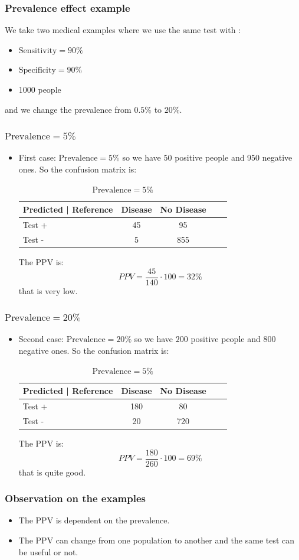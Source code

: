 \documentclass[9pt]{beamer}
\begin{document}
\begin{frame}
\frametitle{Prevalence effect example}
We take two medical examples where we use the same test with :
\begin{itemize}
\item $\mbox{Sensitivity} = 90\%$
\item $\mbox{Specificity} = 90\%$
\item 1000 people
\end{itemize}
and we change the prevalence from $0.5\%$ to $20\%$.
\end{frame}

\begin{frame}
\frametitle{$\mbox{Prevalence} = 5\%$}
\begin{itemize}
\item First case: $\mbox{Prevalence} = 5\%$ so we have $50$ positive people and 950 negative ones. So the confusion matrix is:

\begin{table}
\begin{tabular}{l | c | c | c | c }
Predicted | Reference & Disease & No Disease \\
\hline \hline
Test + & 45 & 95 \\ 
Test - & 5 & 855 \\
\end{tabular}
\caption{$\mbox{Prevalence} = 5\%$}
\end{table}
The PPV is:
$$
PPV = \dfrac{45}{140}\cdot100= 32\%
$$
that is very low.

\end{itemize}
\end{frame}

\begin{frame}
\frametitle{$\mbox{Prevalence} = 20\%$}
\begin{itemize}
\item Second case: $\mbox{Prevalence} = 20\%$ so we have $200$ positive people and 800 negative ones. So the confusion matrix is:

\begin{table}
\begin{tabular}{l | c | c | c | c }
Predicted | Reference & Disease & No Disease \\
\hline \hline
Test + & 180 & 80 \\ 
Test - & 20 & 720 \\
\end{tabular}
\caption{$\mbox{Prevalence} = 5\%$}
\end{table}
The PPV is:
$$
PPV = \dfrac{180}{260}\cdot100= 69\%
$$
that is quite good.
\end{itemize}
\end{frame}
\begin{frame}
\frametitle{Observation on the examples}
\begin{itemize}
\item The PPV is dependent on the prevalence.
\item The PPV can change from one population to another and the same test can be useful or not.
\end{itemize}
\end{frame}
\end{document}
